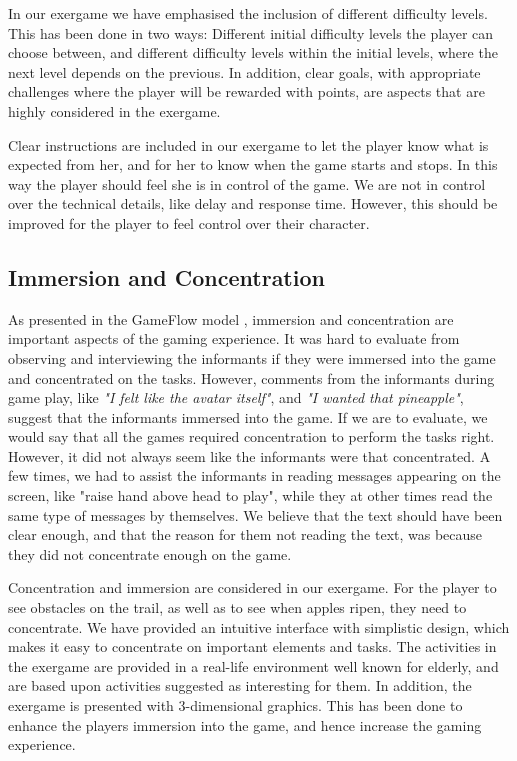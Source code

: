 In our exergame we have emphasised the inclusion of different difficulty levels. This has been done in two ways: Different initial difficulty levels the player can choose between, and different difficulty levels within the initial levels, where the next level depends on the previous. In addition, clear goals, with appropriate challenges where the player will be rewarded with points, are aspects that are highly considered in the exergame.  

Clear instructions are included in our exergame to let the player know what is expected from her, and for her to know when the game starts and stops. In this way the player should feel she is in control of the game. We are not in control over the technical details, like delay and response time. However, this should be improved for the player to feel control over their character.
 
\subsection{Immersion and Concentration}
As presented in the GameFlow model \cite{sweetser}, immersion and concentration are important aspects of the gaming experience. It was hard to evaluate from observing and interviewing the informants if they were immersed into the game and concentrated on the tasks. However, comments from the informants during game play, like \emph{"I felt like the avatar itself"}, and \emph{"I wanted that pineapple"}, suggest that the informants immersed into the game. If we are to evaluate, we would say that all the games required concentration to perform the tasks right. However, it did not always seem like the informants were that concentrated. A few times, we had to assist the informants in reading messages appearing on the screen, like "raise hand above head to play", while they at other times read the same type of messages by themselves. We believe that the text should have been clear enough, and that the reason for them not reading the text, was because they did not concentrate enough on the game. 

Concentration and immersion are considered in our exergame. For the player to see obstacles on the trail, as well as to see when apples ripen, they need to concentrate. We have provided an intuitive interface with simplistic design, which makes it easy to concentrate on important elements and tasks. The activities in the exergame are provided in a real-life environment well known for elderly, and are based upon activities suggested as interesting for them. In addition, the exergame is presented with 3-dimensional graphics. This has been done to enhance the players immersion into the game, and hence increase the gaming experience.


